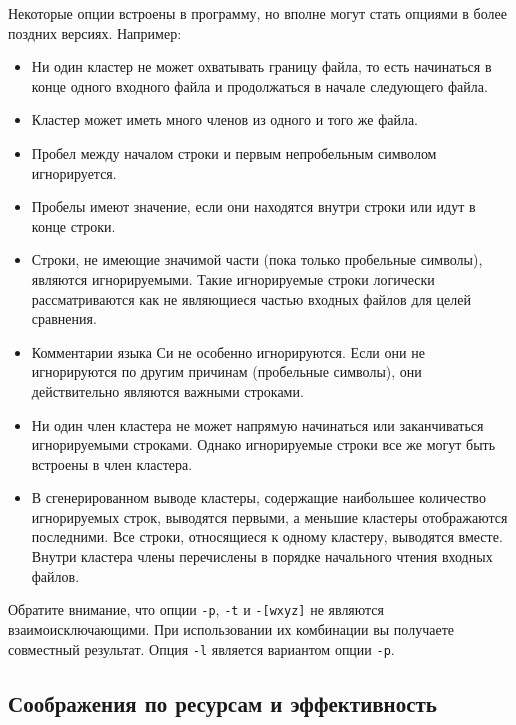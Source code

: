 Некоторые опции встроены в программу, но вполне могут стать опциями в
более поздних версиях. Например:

\begin{itemize}
\item
  Ни один кластер не может охватывать границу файла, то есть начинаться
  в конце одного входного файла и продолжаться в начале следующего
  файла.
\item
  Кластер может иметь много членов из одного и того же файла.
\item
  Пробел между началом строки и первым непробельным символом
  игнорируется.
\item
  Пробелы имеют значение, если они находятся внутри строки или идут в
  конце строки.
\item
  Строки, не имеющие значимой части (пока только пробельные символы),
  являются игнорируемыми. Такие игнорируемые строки логически
  рассматриваются как не являющиеся частью входных файлов для целей
  сравнения.
\item
  Комментарии языка Си не особенно игнорируются. Если они не
  игнорируются по другим причинам (пробельные символы), они
  действительно являются важными строками.
\item
  Ни один член кластера не может напрямую начинаться или заканчиваться
  игнорируемыми строками. Однако игнорируемые строки все же могут быть
  встроены в член кластера.
\item
  В сгенерированном выводе кластеры, содержащие наибольшее количество
  игнорируемых строк, выводятся первыми, а меньшие кластеры отображаются
  последними. Все строки, относящиеся к одному кластеру, выводятся
  вместе. Внутри кластера члены перечислены в порядке начального чтения
  входных файлов.
\end{itemize}

Обратите внимание, что опции \texttt{-p}, \texttt{-t} и
\texttt{-{[}wxyz{]}} не являются взаимоисключающими. При использовании
их комбинации вы получаете совместный результат. Опция \texttt{-l}
является вариантом опции \texttt{-p}.

\hypertarget{_042d_0444_0444_0435_043a_0442_0438_0432_043d_043e_0441_0442_044c}{%
\subsection{Соображения по ресурсам и
эффективность}\label{_042d_0444_0444_0435_043a_0442_0438_0432_043d_043e_0441_0442_044c}}

